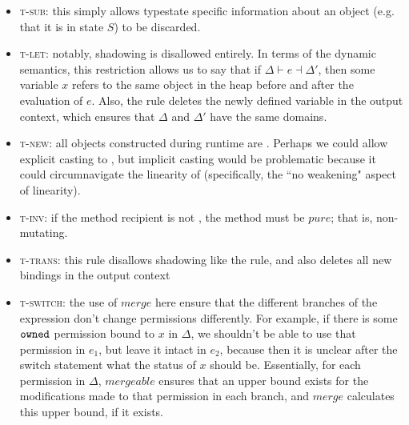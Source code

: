 \documentclass[runningheads,a4paper]{llncs}
\begin{document}
\begin{itemize}
\item \textsc{t-sub}: this simply allows typestate specific information about an object (e.g. that it is in state $S$) to be discarded.

\item \textsc{t-let}: notably, shadowing is disallowed entirely. In terms of the dynamic semantics, this restriction allows us to say that if $\Delta \vdash e \dashv \Delta'$, then some variable $x$ refers to the same object in the heap before and after the evaluation of $e$. Also, the rule deletes the newly defined variable in the output context, which ensures that $\Delta$ and $\Delta'$ have the same domains.

\item \textsc{t-new}: all objects constructed during runtime are \ownedS{}. Perhaps we could allow explicit casting to \sharedS{}, but implicit casting would be problematic because it could circumnavigate the linearity of \ownedS{} (specifically, the ``no weakening" aspect of linearity).

\item \textsc{t-inv}: if the method recipient is not \ownedS{}, the method must be $pure$; that is, non-mutating.
\item \textsc{t-trans}: this rule disallows shadowing like the  rule, and also deletes all new bindings in the output context
\item \textsc{t-switch}: the use of $merge$ here ensure that the different branches of the expression don't change permissions differently. For example, if there is some $\texttt{owned}{}$ permission bound to $x$ in $\Delta$, we shouldn't be able to use that permission in $e_{1}$, but leave it intact in $e_{2}$, because then it is unclear after the switch statement what the status of $x$ should be. Essentially, for each permission in $\Delta$, $mergeable$ ensures that an upper bound exists for the modifications made to that permission in each branch, and $merge$ calculates this upper bound, if it exists.
\end{itemize}

\fi
\end{document}
